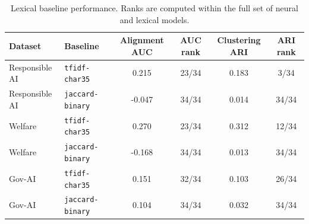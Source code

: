 \begin{table}[t]
\centering
\small
\caption{Lexical baseline performance. Ranks are computed within the full set of neural and lexical models.}
\label{tab:lexical-baselines}
\begin{tabular}{llcccc}
\toprule
\textbf{Dataset} & \textbf{Baseline} & \textbf{Alignment AUC} & \textbf{AUC rank} & \textbf{Clustering ARI} & \textbf{ARI rank} \\
\midrule
Responsible AI & \texttt{tfidf-char35} & 0.215 & 23/34 & 0.183 & 3/34 \\
Responsible AI & \texttt{jaccard-binary} & -0.047 & 34/34 & 0.014 & 34/34 \\
Welfare & \texttt{tfidf-char35} & 0.270 & 23/34 & 0.312 & 12/34 \\
Welfare & \texttt{jaccard-binary} & -0.168 & 34/34 & 0.013 & 34/34 \\
Gov-AI & \texttt{tfidf-char35} & 0.151 & 32/34 & 0.103 & 26/34 \\
Gov-AI & \texttt{jaccard-binary} & 0.104 & 34/34 & 0.032 & 34/34 \\
\bottomrule
\end{tabular}
\end{table}
